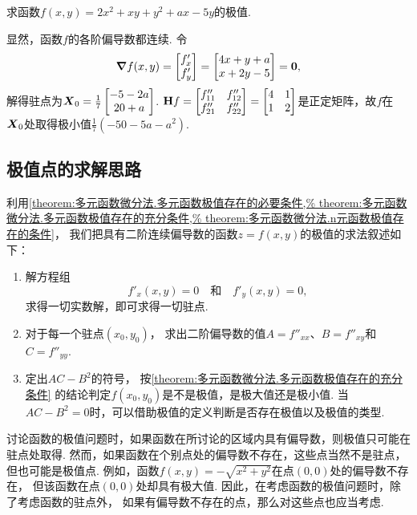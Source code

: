 \begin{example}
求函数\(f(x,y) = 2x^2 + xy + y^2 + ax - 5y\)的极值.
\begin{solution}
显然，函数\(f\)的各阶偏导数都连续.
令\[
\grad f(x,y) = \begin{bmatrix} f'_x \\ f'_y \end{bmatrix}
= \begin{bmatrix} 4x+y+a \\ x+2y-5 \end{bmatrix} = \boldsymbol{0},
\]解得驻点为\(\boldsymbol{X}_{0} = \frac{1}{7} \begin{bmatrix} -5-2a \\ 20+a \end{bmatrix}\).
\(\boldsymbol{\operatorname{H}} f = \begin{bmatrix}
f''_{11} & f''_{12} \\
f''_{21} & f''_{22}
\end{bmatrix} = \begin{bmatrix}
4 & 1 \\
1 & 2
\end{bmatrix}\)是正定矩阵，故\(f\)在\(\boldsymbol{X}_{0}\)处取得极小值\(\frac{1}{7} (-50-5a-a^2)\).
\end{solution}
\end{example}

\subsection{极值点的求解思路}
利用\cref{theorem:多元函数微分法.多元函数极值存在的必要条件,%
theorem:多元函数微分法.多元函数极值存在的充分条件,%
theorem:多元函数微分法.n元函数极值存在的条件}，
我们把具有二阶连续偏导数的函数\(z = f(x,y)\)的极值的求法叙述如下：
\begin{enumerate}
	\item 解方程组\[
		f'_x(x,y) = 0
		\quad\text{和}\quad
		f'_y(x,y) = 0,
	\]求得一切实数解，即可求得一切驻点.

	\item 对于每一个驻点\((x_0,y_0)\)，
	求出二阶偏导数的值\(A=f''_{xx}\)、\(B=f''_{xy}\)和\(C=f''_{yy}\).

	\item 定出\(AC-B^2\)的符号，
	按\cref{theorem:多元函数微分法.多元函数极值存在的充分条件}
	的结论判定\(f(x_0,y_0)\)是不是极值，是极大值还是极小值.
	当\(AC-B^2=0\)时，可以借助极值的定义判断是否存在极值以及极值的类型.
\end{enumerate}

讨论函数的极值问题时，如果函数在所讨论的区域内具有偏导数，则极值只可能在驻点处取得.
然而，如果函数在个别点处的偏导数不存在，这些点当然不是驻点，但也可能是极值点.
例如，函数\(f(x,y) = -\sqrt{x^2+y^2}\)在点\((0,0)\)处的偏导数不存在，
但该函数在点\((0,0)\)处却具有极大值.
因此，在考虑函数的极值问题时，除了考虑函数的驻点外，
如果有偏导数不存在的点，那么对这些点也应当考虑.

